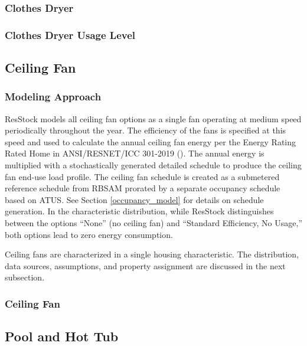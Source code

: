 \subsubsection{Clothes Dryer}\label{clothes_dryer}


\subsubsection{Clothes Dryer Usage Level}


\subsection{Ceiling Fan}
\subsubsection{Modeling Approach}
ResStock models all ceiling fan options as a single fan operating at medium speed periodically throughout the year. The efficiency of the fans is specified at this speed and used to calculate the annual ceiling fan energy per the Energy Rating Rated Home in ANSI/RESNET/ICC 301-2019 (\cite{ansi_resnet_301_2019}). The annual energy is multiplied with a stochastically generated detailed schedule to produce the ceiling fan end-use load profile. The ceiling fan schedule is created as a submetered reference schedule from RBSAM prorated by a separate occupancy schedule based on ATUS. See Section \ref{occupancy_model} for details on schedule generation. In the characteristic distribution, while ResStock distinguishes between the options ``None'' (no ceiling fan) and ``Standard Efficiency, No Usage,'' both options lead to zero energy consumption.

Ceiling fans are characterized in a single housing characteristic. The distribution, data sources, assumptions, and property assignment are discussed in the next subsection.

\subsubsection{Ceiling Fan}


\subsection{Pool and Hot Tub}
